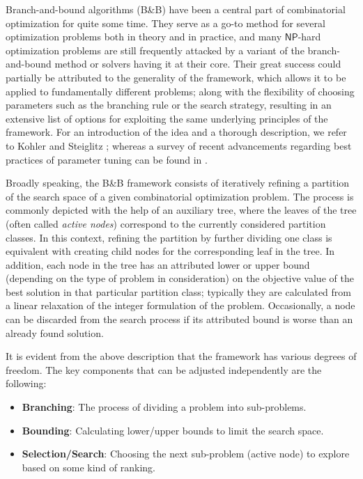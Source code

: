 \documentclass[moor,sglanonrev]{informs4}
\theoremstyle{plain}
\begin{document}
Branch-and-bound algorithms (B\&B) have been a central part of combinatorial optimization for quite some time. They serve as a go-to method for several optimization problems both in theory and in practice, and many $\textsf{NP}$-hard optimization problems are still frequently attacked by a variant of the branch-and-bound method or solvers having it at their core. Their great success could partially be attributed to the generality of the framework, which allows it to be applied to fundamentally different problems; along with the flexibility of choosing parameters such as the branching rule or the search strategy, resulting in an extensive list of options for exploiting the same underlying principles of the framework. For an introduction of the idea and a thorough description, we refer to Kohler and Steiglitz \cite{kohler_steiglitz}; whereas a survey of recent advancements regarding best practices of parameter tuning can be found in \cite{bnb_survey}.

Broadly speaking, the B\&B framework consists of iteratively refining a partition of the search space of a given combinatorial optimization problem. The process is commonly depicted with the help of an auxiliary tree, where the leaves of the tree (often called \emph{active nodes}) correspond to the currently considered partition classes. In this context, refining the partition by further dividing one class is equivalent with creating child nodes for the corresponding leaf in the tree. In addition, each node in the tree has an attributed lower or upper bound (depending on the type of problem in consideration) on the objective value of the best solution in that particular partition class; typically they are calculated from a linear relaxation of the integer formulation of the problem. Occasionally, a node can be discarded from the search process if its attributed bound is worse than an already found solution. 

It is evident from the above description that the framework has various degrees of freedom. The key components that can be adjusted independently are the following:
\begin{itemize}
    \item \textbf{Branching}: The process of dividing a problem into sub-problems.
    \item \textbf{Bounding}: Calculating lower/upper bounds to limit the search space.
    \item \textbf{Selection/Search}: Choosing the next sub-problem (active node) to explore based on some kind of ranking.
\end{itemize}
\end{document}
